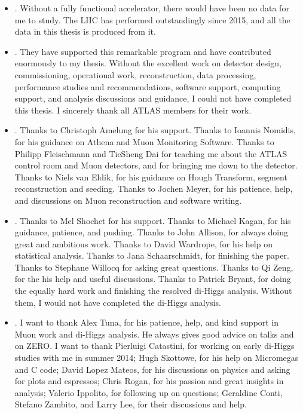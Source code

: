 \begin{itemize}
	\item {}. Without a fully functional accelerator, there would have been no data for me to study. The LHC has performed outstandingly since 2015, and all the data in this thesis is produced from it. 
	\item {}. They have supported this remarkable program and have contributed enormously to my thesis. Without the excellent work on detector design, commissioning, operational work, reconstruction, data processing, performance studies and recommendations, software support, computing support, and analysis discussions and guidance, I could not have completed this thesis. I sincerely thank all ATLAS members for their work.
	\item {}. Thanks to Christoph Amelung for his support. Thanks to Ioannis Nomidis, for his guidance on Athena and Muon Monitoring Software. Thanks to Philipp Fleischmann and TieSheng Dai for teaching me about the ATLAS control room and Muon detectors, and for bringing me down to the detector. Thanks to Niels van Eldik, for his guidance on Hough Transform, segment reconstruction and seeding. Thanks to Jochen Meyer, for his patience, help, and discussions on Muon reconstruction and software writing.
	\item {}. Thanks to Mel Shochet for his support. Thanks to Michael Kagan, for his guidance, patience, and pushing. Thanks to John Allison, for always doing great and ambitious work. Thanks to David Wardrope, for his help on statistical analysis. Thanks to Jana Schaarschmidt, for finishing the paper. Thanks to Stephane Willocq for asking great questions. Thanks to Qi Zeng, for the his help and useful discussions. Thanks to Patrick Bryant, for doing the equally hard work and finishing the resolved di-Higgs analysis. Without them, I would not have completed the di-Higgs analysis.
	\item {}. I want to thank Alex Tuna, for his patience, help, and kind support in Muon work and di-Higgs analysis. He always gives good advice on talks and on ZERO. I want to thank Pierluigi Catastini, for working on early di-Higgs studies with me in summer 2014; Hugh Skottowe, for his help on Micromegas and C code; David Lopez Mateos, for his discussions on physics and asking for plots and espressos; Chris Rogan, for his passion and great insights in analysis; Valerio Ippolito, for following up on questions; Geraldine Conti, Stefano Zambito, and Larry Lee, for their discussions and help.

\end{itemize}
